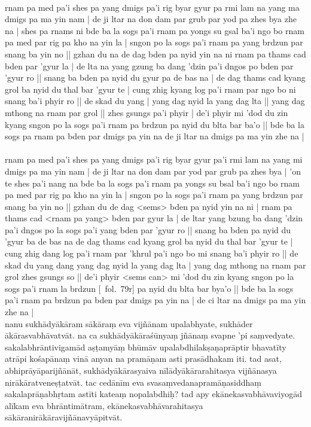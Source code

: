 \documentclass[12pt]{article}
\begin{document}
\textbf{\TVA}\\
rnam pa med pa'i shes pa yang dmigs pa'i rig byar gyur pa rmi lam na yang ma dmigs pa ma yin nam | de ji ltar na don dam par grub par yod pa zhes bya zhe na | shes pa rnams ni bde ba la sogs pa'i rnam pa yongs su gsal ba'i ngo bo rnam pa med par rig pa kho na yin la | sngon po la sogs pa'i rnam pa yang brdzun par snang ba yin no || gzhan du na de dag bden pa nyid yin na ni rnam pa thams cad bden par 'gyur la | de lta na yang gzung ba dang 'dzin pa'i dngos po bden par 'gyur ro || snang ba bden pa nyid du gyur pa de bas na | de dag thams cad kyang grol ba nyid du thal bar 'gyur te | cung zhig kyang log pa'i rnam par ngo bo ni snang ba'i phyir ro || de skad du yang | yang dag nyid la yang dag lta || yang dag mthong na rnam par grol || zhes gsungs pa'i phyir | de'i phyir mi 'dod du zin kyang sngon po la sogs pa'i rnam pa brdzun pa nyid du blta bar ba'o || bde ba la sogs pa rnam pa bden par dmigs pa yin na de ji ltar na dmigs pa ma yin zhe na | \\

\textbf{\TVB}\\
rnam pa med pa'i shes pa yang dmigs pa'i rig byar gyur pa'i rmi lam na yang mi dmigs pa ma yin nam | de ji ltar na don dam par yod par grub pa zhes bya | 'on te shes pa'i nang na bde ba la sogs pa'i rnam pa yongs su bsal ba'i ngo bo rnam pa med par rig pa kho na yin la | sngon po la sogs pa'i rnam pa yang brdzun par snang ba yin no || gzhan du de dag <sems> bden pa nyid yin na ni | rnam pa thams cad <rnam pa yang> bden par gyur la | de ltar yang bzung ba dang 'dzin pa'i dngos po la sogs pa'i yang bden par 'gyur ro || snang ba bden pa nyid du 'gyur ba de bas na de dag thams cad kyang grol ba nyid du thal bar 'gyur te | cung zhig dang log pa'i rnam par 'khrul pa'i ngo bo mi snang ba'i phyir ro || de skad du yang dang yang dag nyid la yang dag lta | yang dag mthong na rnam par grol zhes gsungs so || de'i phyir <sems can> mi 'dod du zin kyang sngon po la sogs pa'i rnam la brdzun [\TVB\ fol.\ 79r] pa nyid du blta bar bya'o || bde ba la sogs pa'i rnam pa brdzun pa bden par dmigs pa yin na | de ci ltar na dmigs pa ma yin zhe na |\\

nanu sukhādyākāram sākāraṃ eva vijñānam\footnoteB{
	sākāraṃ eva vijñānam] \conj (\TIB : rnam pa dang bcas pa'i kho na shes pa); eva vijñānam \MS\ \EDD
} upalabhyate, sukhāder ākārasvabhāvatvāt. na ca sukhādyākāraśūnyaṃ jñānaṃ svapne 'pi saṃvedyate. sakalabhrāntivigamād aṣṭamyāṃ bhūmāv upalabdhilakṣaṇaprāptir bhavatīty atrāpi kośapānaṃ\footnoteB{
	kośapānaṃ] \MS\ (kosapānaṃ); śapathollaṅghanaṃ \EDD\ (\emd)
} vinā anyan na\footnoteB{
	anyan na] \EDD ; anyatra \MS
} pramāṇam asti prasādhakam iti. tad asat,\footnoteB{
	tad asat] \conj\ (\TIB : de ni bden pa ma yin te); tad \MS\ \EDD ; asad etat \possibleconj
} abhiprāyāparijñānāt, sukhādyākārasyaiva nīlādyākārarahitasya vijñānasya nirākāratveneṣṭatvāt. tac cedānīm eva svasaṃvedanapramāṇasiddhaṃ sakalaprāṇabhṛtam\footnoteB{
	°bhṛtam] \emd ; °bhṛtām \MS\ \EDD
} astīti kateaṃ nopalabdhiḥ? tad\footnoteB{
	tad] \conj ; nanu tad \MS\ \EDD
} apy ekānekasvabhāvaviyogād alīkam eva bhrāntimātram, ekānekasvabhāvarahitasya sākāranirākāravijñānavyāpitvāt.\\
\end{document}
